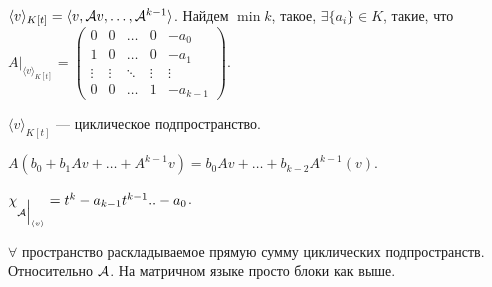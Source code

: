 \begin{statement}
    $\langle v \rangle_{K[t]} = \langle v, \mathcal{A} v, \ldots, \mathcal{A}^{k-1} \rangle$. Найдем $\min k$, такое, $\exists \{a_i\} \! \in K$, такие, что  $A\Big|_{\langle v\rangle_{K[t]}} = \begin{pmatrix} 0 & 0 & \ldots & 0 & -a_0 \\ 1 & 0 & \ldots & 0 & -a_1 \\ \vdots & \vdots & \ddots & \vdots & \vdots\\ 0 & 0 & \ldots & 1 & -a_{k-1} \end{pmatrix}$.

    $\langle v\rangle_{K[t]}$ --- циклическое подпространство. 

    $A(b_0 + b_1 Av + \ldots + A^{k-1}v) = b_0Av + \ldots + b_{k-2}A^{k-1}(v)$.
\end{statement}
\begin{statement}
    $\chi_{\mathcal{A} \Big|_{\langle v \rangle}} = t^k - a_{k-1}t^{k-1} .. - a_0$.
\end{statement}
\begin{statement}
    $\forall$ пространство раскладываемое прямую сумму циклических подпространств. Относительно $\mathcal{A}$. На матричном языке просто блоки как выше.
\end{statement}
